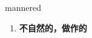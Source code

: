 
\begin{frame}
{\huge mannered}
\begin{center}
\begin{enumerate}\Large
  \item \textbf{不自然的，做作的}
\end{enumerate}
\end{center}
\end{frame}
